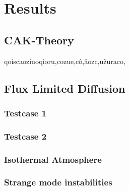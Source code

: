 \section{Results}

\subsection{CAK-Theory}
qoiscaoziuoqioru,cozue,cô,âozc,uẑuraco,

\subsection{Flux Limited Diffusion}
\subsubsection{Testcase 1}
\subsubsection{Testcase 2}
\subsubsection{Isothermal Atmosphere}
\subsubsection{Strange mode instabilities}
